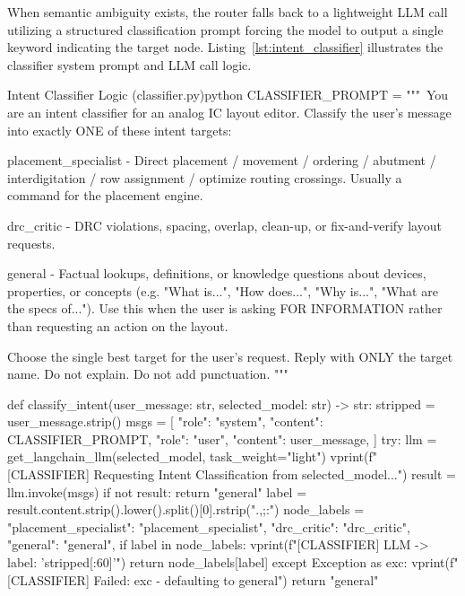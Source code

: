 When semantic ambiguity exists, the router falls back to a lightweight LLM call utilizing a structured classification prompt forcing the model to output a single keyword indicating the target node. Listing~\ref{lst:intent_classifier} illustrates the classifier system prompt and LLM call logic.

\begin{thesiscode}{Intent Classifier Logic (classifier.py)\label{lst:intent_classifier}}{python}
CLASSIFIER_PROMPT = """\
You are an intent classifier for an analog IC layout editor.
Classify the user's message into exactly ONE of these intent targets:

    placement_specialist - Direct placement / movement / ordering /
                           abutment / interdigitation / row assignment / optimize routing crossings.
                           Usually a command for the placement engine.

    drc_critic           - DRC violations, spacing, overlap, clean-up,
                           or fix-and-verify layout requests.

    general              - Factual lookups, definitions, or knowledge
                           questions about devices, properties, or concepts
                           (e.g. "What is...", "How does...", "Why is...",
                           "What are the specs of..."). Use this when the
                           user is asking FOR INFORMATION rather than
                           requesting an action on the layout.

Choose the single best target for the user's request.
Reply with ONLY the target name.
Do not explain. Do not add punctuation.
"""

def classify_intent(user_message: str, selected_model: str) -> str:
    stripped = user_message.strip()
    msgs = [
        {"role": "system", "content": CLASSIFIER_PROMPT},
        {"role": "user",   "content": user_message},
    ]
    try:
        llm = get_langchain_llm(selected_model, task_weight="light")
        vprint(f"[CLASSIFIER] Requesting Intent Classification from {selected_model}...")
        result = llm.invoke(msgs)
        if not result:
            return "general"
        label = result.content.strip().lower().split()[0].rstrip(".,;:")
        node_labels = {
            "placement_specialist": "placement_specialist",
            "drc_critic": "drc_critic",
            "general": "general",
        }
        if label in node_labels:
            vprint(f"[CLASSIFIER] LLM -> {label}: '{stripped[:60]}'")
            return node_labels[label]
    except Exception as exc:
        vprint(f"[CLASSIFIER] Failed: {exc} - defaulting to general")
    return "general"
\end{thesiscode}

